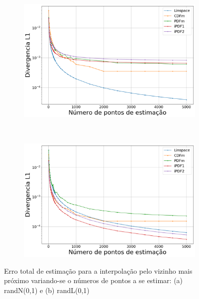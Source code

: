 \begin{figure}[H]
	\centering
	\begin{subfigure}[b]{0.45\textwidth}
		\centering 
		\includegraphics[width=\textwidth]{./figuras/ERRORPLOT_L1_FALSE_NORMAL_NEAREST_10000}
		\caption{}
		\label{fig:errornormnearest_data}
	\end{subfigure}
	\hfill
	~ %
	\begin{subfigure}[b]{0.45\textwidth}
		\centering 
		\includegraphics[width=\textwidth]{./figuras/ERRORPLOT_L1_FALSE_LOGNORMAL_NEAREST_10000}
		\caption{}
		\label{fig:errorlognearest_data}
	\end{subfigure}
	
	\caption{Erro total de estimação para a interpolação pelo vizinho mais próximo variando-se o números de pontos a se estimar: (a) randN(0,1) e (b) randL(0,1)}
	\label{fig:errorplotnearest_data}
\end{figure}

